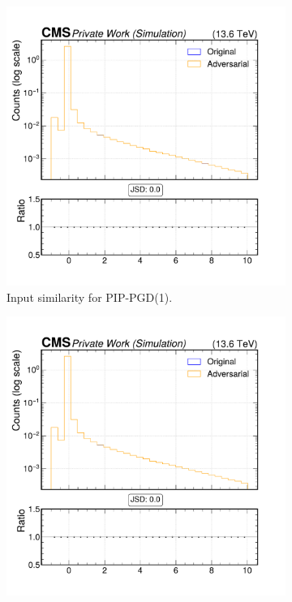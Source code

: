 \begin{figure}[h]
  \centering
  \begin{subfigure}[t]{0.32\textwidth}
    \includegraphics[width=\linewidth]{media/output/features/compare/combined_it_1/cmp_cpf_arr_Cpfcan_BtagPf_trackSip2dVal.pdf}
    \caption*{Input similarity for PIP-PGD(1).}
  \end{subfigure}\hfill
  \begin{subfigure}[t]{0.32\textwidth}
    \includegraphics[width=\linewidth]{media/output/features/compare/combined_it_2/cmp_cpf_arr_Cpfcan_BtagPf_trackSip2dVal.pdf}

\end{subfigure}
\end{figure}
